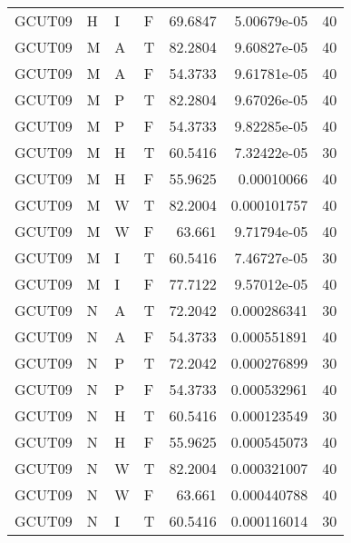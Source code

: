 \begin{longtable}{llllrrr}
    GCUT09   & H         & I         & F          & 69.6847    & 5.00679e-05 & 40       \\
    GCUT09   & M         & A         & T          & 82.2804    & 9.60827e-05 & 40       \\
    GCUT09   & M         & A         & F          & 54.3733    & 9.61781e-05 & 40       \\
    GCUT09   & M         & P         & T          & 82.2804    & 9.67026e-05 & 40       \\
    GCUT09   & M         & P         & F          & 54.3733    & 9.82285e-05 & 40       \\
    GCUT09   & M         & H         & T          & 60.5416    & 7.32422e-05 & 30       \\
    GCUT09   & M         & H         & F          & 55.9625    & 0.00010066  & 40       \\
    GCUT09   & M         & W         & T          & 82.2004    & 0.000101757 & 40       \\
    GCUT09   & M         & W         & F          & 63.661     & 9.71794e-05 & 40       \\
    GCUT09   & M         & I         & T          & 60.5416    & 7.46727e-05 & 30       \\
    GCUT09   & M         & I         & F          & 77.7122    & 9.57012e-05 & 40       \\
    GCUT09   & N         & A         & T          & 72.2042    & 0.000286341 & 30       \\
    GCUT09   & N         & A         & F          & 54.3733    & 0.000551891 & 40       \\
    GCUT09   & N         & P         & T          & 72.2042    & 0.000276899 & 30       \\
    GCUT09   & N         & P         & F          & 54.3733    & 0.000532961 & 40       \\
    GCUT09   & N         & H         & T          & 60.5416    & 0.000123549 & 30       \\
    GCUT09   & N         & H         & F          & 55.9625    & 0.000545073 & 40       \\
    GCUT09   & N         & W         & T          & 82.2004    & 0.000321007 & 40       \\
    GCUT09   & N         & W         & F          & 63.661     & 0.000440788 & 40       \\
    GCUT09   & N         & I         & T          & 60.5416    & 0.000116014 & 30       \\

\end{longtable}
